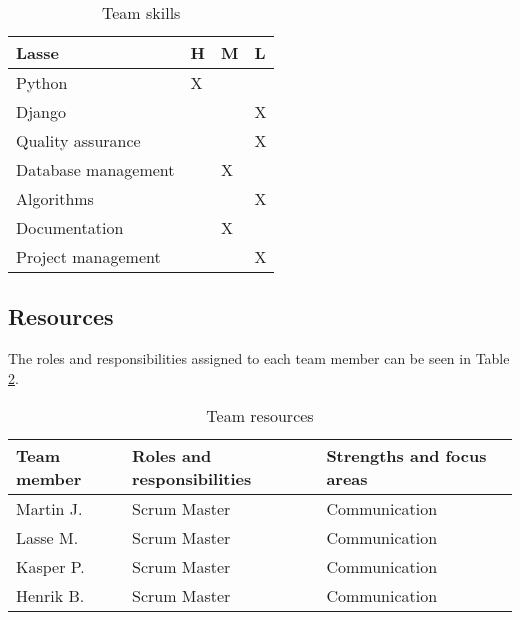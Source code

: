 \begin{table}[!ht]
{        \centering
        \small
        \begin{tabular}{l|l|l|l}
            \rowcolor{Gray}
            \textbf{Lasse} & \textbf{H} & \textbf{M} & \textbf{L}\\\hline
             Python & X & &\\
             Django & & & X\\
             Quality assurance & & & X\\
             Database management & & X &\\
             Algorithms & & & X\\
             Documentation & & X &\\
             Project management & & & X
        \end{tabular}
        }%
    \caption{Team skills}
    \label{tab:skills}
\end{table}

\subsection{Resources}
The roles and responsibilities assigned to each team member can be seen in Table \ref{tab:resources}.


\begin{table}[!ht]
    \centering
    \begin{tabular}{l|l|l}
        \rowcolor{Gray}
        \textbf{Team member} & \textbf{Roles and responsibilities} & \textbf{Strengths and focus areas}\\\hline
        Martin J.            & Scrum Master & Communication\\
        Lasse M.             & Scrum Master & Communication\\
        Kasper P.            & Scrum Master & Communication\\
        Henrik B.            & Scrum Master & Communication\\
    \end{tabular}
    \caption{Team resources}
    \label{tab:resources}
\end{table}


